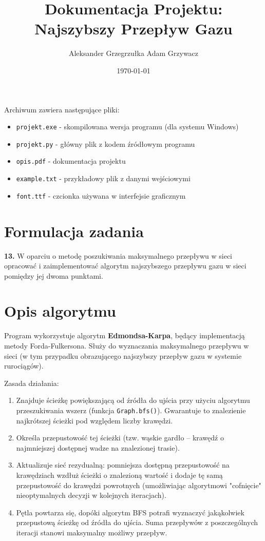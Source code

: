 \documentclass{article}
\author{Aleksander Grzegrzułka \qquad Adam Grzywacz}
\affil{Wydział Zastosowań Informatyki i Matematyki, Szkoła Główna Gospodarstwa Wiejskiego w Warszawie}
\title{Dokumentacja Projektu: Najszybszy Przepływ Gazu}
\date{\today}
\begin{document}
	
	\maketitle
	
	
	\justify
	
	Archiwum zawiera następujące pliki:
	
	
	\begin{itemize}
		\item \texttt{projekt.exe} - skompilowana wersja programu (dla systemu Windows)
		\item \texttt{projekt.py} - główny plik z kodem źródłowym programu
		\item \texttt{opis.pdf} - dokumentacja projektu
		\item \texttt{example.txt} - przykładowy plik z danymi wejściowymi
		\item \texttt{font.ttf} - czcionka używana w interfejsie graficznym
	\end{itemize}
	
	\section{Formulacja zadania}
	
	\textbf{13.} W oparciu o metodę poszukiwania maksymalnego przepływu w sieci opracować i zaimplementować algorytm najszybszego przepływu gazu w sieci pomiędzy jej dwoma punktami.
	
	\section{Opis algorytmu}
	
	Program wykorzystuje algorytm \textbf{Edmondsa-Karpa}, będący implementacją metody Forda-Fulkersona. Służy do wyznaczania maksymalnego przepływu w sieci (w tym przypadku obrazującego najszybszy przepływ gazu w systemie rurociągów).
	
	Zasada działania:
	
	\begin{enumerate}
		\item Znajduje ścieżkę powiększającą od źródła do ujścia przy użyciu algorytmu przeszukiwania wszerz (funkcja \texttt{Graph.bfs()}). Gwarantuje to znalezienie najkrótszej ścieżki pod względem liczby krawędzi.
		\item Określa przepustowość tej ścieżki (tzw. wąskie gardło – krawędź o najmniejszej dostępnej wadze na znalezionej trasie).
		\item Aktualizuje sieć rezydualną: pomniejsza dostępną przepustowość na krawędziach wzdłuż ścieżki o znalezioną wartość i dodaje tę samą przepustowość do krawędzi powrotnych (umożliwiając algorytmowi "cofnięcie" nieoptymalnych decyzji w kolejnych iteracjach).
		\item Pętla powtarza się, dopóki algorytm BFS potrafi wyznaczyć jakąkolwiek przepustową ścieżkę od źródła do ujścia. Suma przepływów z poszczególnych iteracji stanowi maksymalny możliwy przepływ.
	\end{enumerate}
	
\end{document}

